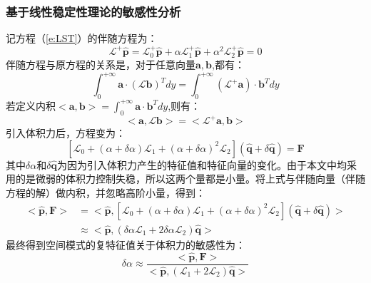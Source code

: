 \subsubsection{基于线性稳定性理论的敏感性分析}
记方程（\ref{e:LST}）的伴随方程为：
\begin{equation}\label{e:aLST}
  \mathscr{L}^+\hat{\mathbf{p}}=\mathscr{L}_0^+\hat{\mathbf{p}}+\alpha \mathscr{L}_1^+\hat{\mathbf{p}} + \alpha^2\mathscr{L}_2^+\hat{\mathbf{p}}=0
\end{equation}
伴随方程与原方程的关系是，对于任意向量$\mathbf{a},\mathbf{b}$,都有：
\begin{equation}
    \int_{0}^{+\infty}\mathbf{a}\cdot(\mathscr{L}\mathbf{b})^Tdy=\int_{0}^{+\infty}(\mathscr{L}^+\mathbf{a})\cdot\mathbf{b}^Tdy
\end{equation}
若定义内积$<\mathbf{a},\mathbf{b}>=\int_{0}^{+\infty}\mathbf{a}\cdot\mathbf{b}^Tdy$,则有：
\begin{equation}\label{}
  <\mathbf{a},\mathscr{L}\mathbf{b}> = <\mathscr{L}^+\mathbf{a},\mathbf{b}>
\end{equation}
引入体积力后，方程变为：
\begin{equation}\label{}
  \left[\mathscr{L}_0+(\alpha + \delta\alpha) \mathscr{L}_1 + (\alpha + \delta\alpha)^2\mathscr{L}_2\right](\hat{\mathbf{q}}+\delta\hat{\mathbf{q}})=\mathbf{F}
\end{equation}
其中$\delta\alpha$和$\delta\hat{\mathbf{q}}$为因为引入体积力产生的特征值和特征向量的变化。由于本文中均采用的是微弱的体积力控制失稳，所以这两个量都是小量。将上式与伴随向量（伴随方程的解）做内积，并忽略高阶小量，得到：
\begin{equation}\label{}
  \begin{aligned}
    <\hat{\mathbf{p}},\mathbf{F}> &= <\hat{\mathbf{p}},\left[\mathscr{L}_0+(\alpha + \delta\alpha) \mathscr{L}_1 + (\alpha + \delta\alpha)^2\mathscr{L}_2\right](\hat{\mathbf{q}}+\delta\hat{\mathbf{q}})> \\
    &\approx  <\hat{\mathbf{p}},(\delta\alpha \mathscr{L}_1+2\delta\alpha\mathscr{L}_2)\hat{\mathbf{q}}>
  \end{aligned}
\end{equation}
最终得到空间模式的复特征值关于体积力的敏感性为：
\begin{equation}\label{}
  \delta\alpha \approx \frac{<\hat{\mathbf{p}},\mathbf{F}>}{<\hat{\mathbf{p}},( \mathscr{L}_1+2\mathscr{L}_2)\hat{\mathbf{q}}>}
\end{equation}

